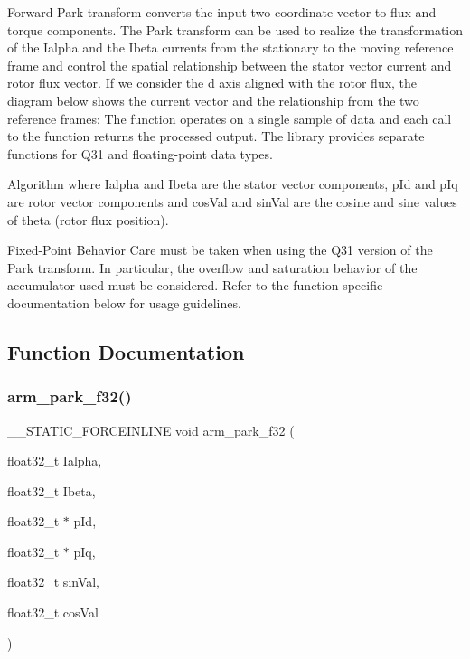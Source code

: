 Forward Park transform converts the input two-\/coordinate vector to flux and torque components. The Park transform can be used to realize the transformation of the {\ttfamily Ialpha} and the {\ttfamily Ibeta} currents from the stationary to the moving reference frame and control the spatial relationship between the stator vector current and rotor flux vector. If we consider the d axis aligned with the rotor flux, the diagram below shows the current vector and the relationship from the two reference frames\+:  The function operates on a single sample of data and each call to the function returns the processed output. The library provides separate functions for Q31 and floating-\/point data types. \begin{DoxyParagraph}{Algorithm}
 where {\ttfamily Ialpha} and {\ttfamily Ibeta} are the stator vector components, {\ttfamily p\+Id} and {\ttfamily p\+Iq} are rotor vector components and {\ttfamily cos\+Val} and {\ttfamily sin\+Val} are the cosine and sine values of theta (rotor flux position). 
\end{DoxyParagraph}
\begin{DoxyParagraph}{Fixed-\/\+Point Behavior}
Care must be taken when using the Q31 version of the Park transform. In particular, the overflow and saturation behavior of the accumulator used must be considered. Refer to the function specific documentation below for usage guidelines. 
\end{DoxyParagraph}


\subsection{Function Documentation}
\mbox{\label{group__park_ga18f92d09e080edc98a00c01886b56b5d}} 
\subsubsection{\texorpdfstring{arm\_park\_f32()}{arm\_park\_f32()}}
{\footnotesize\ttfamily \+\_\+\+\_\+\+S\+T\+A\+T\+I\+C\+\_\+\+F\+O\+R\+C\+E\+I\+N\+L\+I\+NE void arm\+\_\+park\+\_\+f32 (\begin{DoxyParamCaption}\item[{float32\+\_\+t}]{Ialpha,  }\item[{float32\+\_\+t}]{Ibeta,  }\item[{float32\+\_\+t $\ast$}]{p\+Id,  }\item[{float32\+\_\+t $\ast$}]{p\+Iq,  }\item[{float32\+\_\+t}]{sin\+Val,  }\item[{float32\+\_\+t}]{cos\+Val }\end{DoxyParamCaption})}



